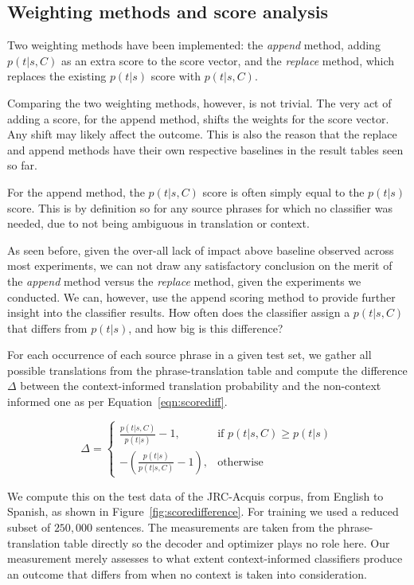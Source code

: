 \subsection{Weighting methods and score analysis}
\label{sec:weighting}

Two weighting methods have been implemented: the \emph{append} method, adding
$p(t|s,C)$ as an extra score to the score vector, and the \emph{replace}
method, which replaces the existing $p(t|s)$ score with $p(t|s,C)$.

Comparing the two weighting methods, however, is not trivial.  The very act of
adding a score, for the append method, shifts the weights for the score vector.
Any shift may likely affect the outcome. This is also the reason that the
replace and append methods have their own respective baselines in the result
tables seen so far.

For the append method, the $p(t|s,C)$ score is often simply
equal to the $p(t|s)$ score. This is by definition so for any source phrases for which no
classifier was needed, due to not being ambiguous in translation or context.

As seen before, given the over-all lack of impact above baseline observed across most
experiments, we can not draw any satisfactory conclusion on the merit of the
\emph{append} method versus the \emph{replace} method, given the experiments we
conducted. We can, however, use the append scoring method to provide further insight into
the classifier results. How often does the classifier assign a $p(t|s,C)$ that
differs from $p(t|s)$, and how big is this difference?

For each occurrence of each source phrase in a given test set, we gather all
possible translations from the phrase-translation table and compute the
difference $\Delta$ between the context-informed translation probability and
the non-context informed one as per Equation~\ref{eqn:scorediff}.

\begin{equation}
  \Delta =
\begin{cases}
 \frac{p(t|s,C)}{p(t|s)} - 1, & \text{if } p(t|s,C) \geq p(t|s)  \\
 -(\frac{p(t|s)}{p(t|s,C)} - 1), & \text{otherwise}
\end{cases}
\label{eqn:scorediff}
\end{equation}


We compute this on the test data of the JRC-Acquis corpus,
from English to Spanish, as shown in Figure~\ref{fig:scoredifference}. For
training we used a reduced subset of $250,000$ sentences. The measurements are taken
from the phrase-translation table directly so the decoder and optimizer plays
no role here. Our measurement merely assesses to what extent context-informed classifiers produce an outcome that
differs from when no context is taken into consideration.

